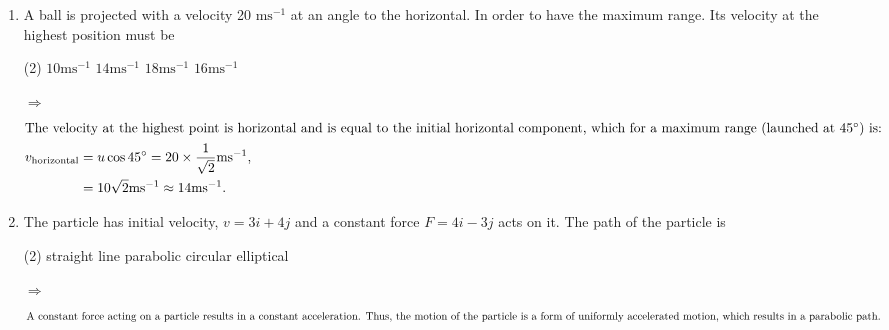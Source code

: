 \documentclass{article}
\renewcommand{\frac}[2]{\dfrac{#1}{#2}}
\newenvironment{solution}{\par\noindent\color{red!85!black}$\Rightarrow$\vspace{0em}}{}
\begin{document}
\begin{enumerate}
    \item A ball is projected with a velocity 20 \(\text{ms}^{-1}\) at an angle to the horizontal. In order to have the maximum range. Its velocity at the highest position must be
        \begin{tasks}(2)
            \task \(10 \text{ms}^{-1}\)
            \task \(14 \text{ms}^{-1}\) \ans
            \task \(18 \text{ms}^{-1}\) 
            \task \(16 \text{ms}^{-1}\)
        \end{tasks}
    \begin{solution}
        \begin{align*}
            \intertext{The velocity at the highest point is horizontal and is equal to the initial horizontal component, which for a maximum range (launched at \(45^\circ\)) is:}
            v_{\text{horizontal}} &= u \cos 45^\circ = 20 \times \frac{1}{\sqrt{2}} \text{ms}^{-1}, \\
            &= 10\sqrt{2} \text{ms}^{-1} \approx 14 \text{ms}^{-1}.
        \end{align*}
    \end{solution}
    \item The particle has initial velocity, \(v = 3i + 4j\) and a constant force \(F = 4i - 3j\) acts on it. The path of the particle is
        \begin{tasks}(2)
            \task straight line
            \task parabolic \ans
            \task circular
            \task elliptical
        \end{tasks}
    \begin{solution}
        \begin{align*}
            \intertext{A constant force acting on a particle results in a constant acceleration. Thus, the motion of the particle is a form of uniformly accelerated motion, which results in a parabolic path.}
        \end{align*}
    \end{solution}
    

\end{enumerate}
\end{document}
